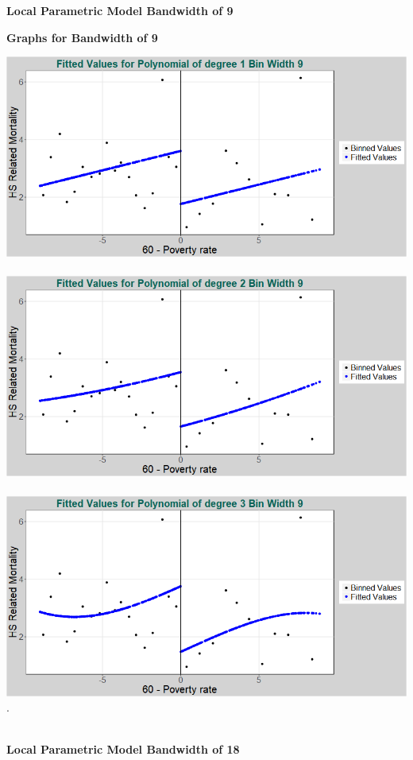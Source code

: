 \documentclass[11pt]{article}
\begin{document}
\begin{center}
	\centering
	\textbf{Local Parametric Model Bandwidth of 9 }\par\medskip
	\scalebox{1}{
		
	}
\end{center}

\begin{center}
	{\large \bf{Graphs for Bandwidth of 9}}
\end{center}

\includegraphics[width=.8\linewidth]{plot_223_poly_1_bw_9.png}
\\ \\
\includegraphics[width=.8\linewidth]{plot_223_poly_2_bw_9.png}
\\ \\
\includegraphics[width=.8\linewidth]{plot_223_poly_3_bw_9.png}
.
\\
\\

\begin{center}
	\centering
	\textbf{Local Parametric Model Bandwidth of 18 }\par\medskip
	\scalebox{1}{
		
	}
\end{center}
\end{document}
